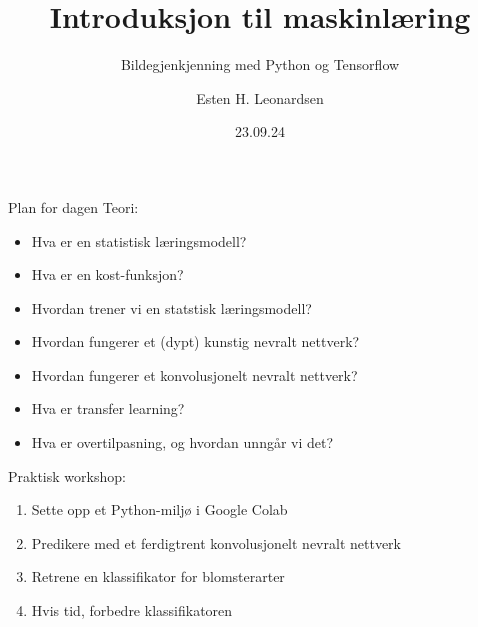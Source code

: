 \documentclass[8pt]{beamer}
\date{23.09.24}
\title{Introduksjon til maskinlæring}
\subtitle{Bildegjenkjenning med Python og Tensorflow}
\author{Esten H. Leonardsen}
\begin{document}
	 \begin{frame}
	 	\maketitle
	 \end{frame}

	\begin{frame}{Plan for dagen}
		\vfill
		Teori:
		\begin{itemize}
			\item Hva er en statistisk læringsmodell?
			\item Hva er en kost-funksjon?
			\item Hvordan trener vi en statstisk læringsmodell?
			\item Hvordan fungerer et (dypt) kunstig nevralt nettverk?
			\item Hvordan fungerer et konvolusjonelt nevralt nettverk?
			\item Hva er transfer learning?
			\item Hva er overtilpasning, og hvordan unngår vi det?
		\end{itemize}
		Praktisk workshop:
		\begin{enumerate}
			\item Sette opp et Python-miljø i Google Colab
			\item Predikere med et ferdigtrent konvolusjonelt nevralt nettverk
			\item Retrene en klassifikator for blomsterarter
			\item Hvis tid, forbedre klassifikatoren
		\end{enumerate}
		\vfill
	\end{frame}



\end{document}
